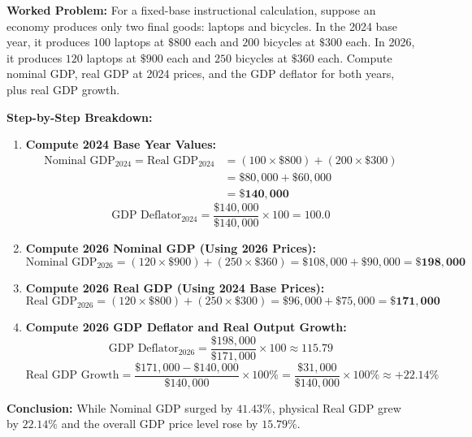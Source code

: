 \documentclass[11pt,letterpaper]{article}
\begin{document}
\noindent\textbf{Worked Problem:}
For a fixed-base instructional calculation, suppose an economy produces only two final goods: laptops and bicycles. In the 2024 base year, it produces $100$ laptops at $\$800$ each and $200$ bicycles at $\$300$ each. In 2026, it produces $120$ laptops at $\$900$ each and $250$ bicycles at $\$360$ each. Compute nominal GDP, real GDP at 2024 prices, and the GDP deflator for both years, plus real GDP growth.

\noindent\textbf{Step-by-Step Breakdown:}
\begin{enumerate}
    \item \textbf{Compute 2024 Base Year Values:}
    \[
    \begin{aligned}
    \text{Nominal GDP}_{2024} = \text{Real GDP}_{2024}
    &= (100 \times \$800) + (200 \times \$300) \\
    &= \$80{,}000 + \$60{,}000 \\
    &= \mathbf{\$140{,}000}
    \end{aligned}
    \]
    \[
    \text{GDP Deflator}_{2024} = \frac{\$140{,}000}{\$140{,}000} \times 100 = \mathbf{100.0}
    \]

    \item \textbf{Compute 2026 Nominal GDP (Using 2026 Prices):}
    \[
    \text{Nominal GDP}_{2026} = (120 \times \$900) + (250 \times \$360) = \$108{,}000 + \$90{,}000 = \mathbf{\$198{,}000}
    \]

    \item \textbf{Compute 2026 Real GDP (Using 2024 Base Prices):}
    \[
    \text{Real GDP}_{2026} = (120 \times \$800) + (250 \times \$300) = \$96{,}000 + \$75{,}000 = \mathbf{\$171{,}000}
    \]

    \item \textbf{Compute 2026 GDP Deflator and Real Output Growth:}
    \[
    \text{GDP Deflator}_{2026} = \frac{\$198{,}000}{\$171{,}000} \times 100 \approx \mathbf{115.79}
    \]
    \[
    \text{Real GDP Growth} = \frac{\$171{,}000 - \$140{,}000}{\$140{,}000} \times 100\% = \frac{\$31{,}000}{\$140{,}000} \times 100\% \approx \mathbf{+22.14\%}
    \]
\end{enumerate}
\textbf{Conclusion:} While Nominal GDP surged by $41.43\%$, physical Real GDP grew by $22.14\%$ and the overall GDP price level rose by $15.79\%$.
\end{document}

